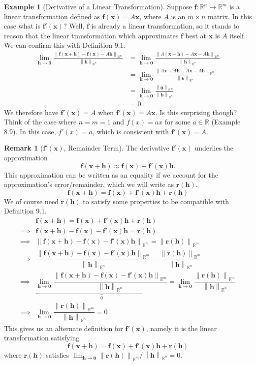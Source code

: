 \documentclass{article}
\newcommand{\R}{\mathbb{R}}
\newcommand{\x}{\mathbf{x}}
\newcommand{\f}{\mathbf{f}}
\newcommand{\h}{\mathbf{h}}
\newcommand{\ze}{\mathbf{0}}
\newcommand{\norm}[1]{\left\lVert#1\right\rVert}
\theoremstyle{definition}
\newtheorem{example}{Example}[section]
\newtheorem{remark}{Remark}[section]
\begin{document}
	\begin{example}[Derivative of a Linear Transformation]
		Suppose $ \f:\R^n\to \R^m $ is a linear transformation defined as $ \f(\x)=A\x $, where  $ A $ is an $ m\times n $ matrix. In this case what is $ \f'(\x) $? Well, $ \f $ is already a linear transformation, so it stands to reason that the linear transformation which approximates $ \f $ best at $ \x $ is $ A $ itself. We can confirm this with Definition 9.1:
		\begin{align*}
			\lim\limits_{\mathbf h\to \ze}\frac{\norm{\f(\x+\mathbf h) - \f(\x)-A\mathbf{h}}_{\R^m}}{\norm{\mathbf h}_{\R^n}} & = 	\lim\limits_{\mathbf h\to \ze}\frac{\norm{A(\x+\mathbf h) - A\x-A\mathbf{h}}_{\R^m}}{\norm{\mathbf h}_{\R^n}} \\ & = 	\lim\limits_{\mathbf h\to \ze}\frac{\norm{A\x+ A\mathbf h - A\x-A\mathbf{h}}_{\R^m}}{\norm{\mathbf h}_{\R^n}}\\
			& = \lim\limits_{\mathbf h\to \ze}\frac{\norm{\ze}_{\R^m}}{\norm{\mathbf h}_{\R^n}}\\ & = 0.
		\end{align*}
		We therefore have $ \f'(\x)= A $ when $ \f'(\x)=A\x $. Is this surprising though? Think of the case where $ n=m=1 $ and $ f(x)=ax $ for some $ a\in \R $ (Example 8.9). In this case, $ f'(x)=a $, which is consistent with $ \f'(\x) = A$. 
	\end{example}
	\begin{remark}[$ \f'(\x) $,  Remainder Term]
		The derivative $ \f'(\x) $ underlies the approximation 
		$$\f(\x+\h) \approx \f(\x) + \f'(\x)\h .$$ This approximation can be written as an equality if we account for the approximation's error/remainder, which we will write as $ \mathbf r(\h) $. $$ \f(\x+\h) = \f(\x) + \f'(\x)\h + \mathbf r(\h) $$ 
		We of course need $ \mathbf r(\h) $ to satisfy some properties to be compatible with Definition 9.1. 
		\begin{align*}
			& \f(\x+\h) = \f(\x) + \f'(\x)\h + \mathbf r(\h)\\
			\implies & \f(\x+\h) - \f(\x) - \f'(\x)\h   =  \mathbf r(\h)\\ 
			\implies & \norm{\f(\x+\h) - \f(\x) - \f'(\x)\h}_{\R^m} = \norm{\mathbf r(\h)}_{\R^m}\\
			\implies & \dfrac{\norm{\f(\x+\h) - \f(\x) - \f'(\x)\h}_{\R^m}}{\norm{\h}_{\R^n}} = \dfrac{\norm{\mathbf r(\h)}_{\R^m}}{\norm{\h}_{\R^n}}\\
			\implies & \underbrace{\lim\limits_{\mathbf h\to \ze}\dfrac{\norm{\f(\x+\h) - \f(\x) - \f'(\x)\h}_{\R^m}}{\norm{\h}_{\R^n}}}_0 = \lim\limits_{\mathbf h\to \ze}\dfrac{\norm{\mathbf r(\h)}_{\R^m}}{\norm{\h}_{\R^n}} \\
			\implies & \lim\limits_{\mathbf h\to \ze}\dfrac{\norm{\mathbf r(\h)}_{\R^m}}{\norm{\h}_{\R^n}} = 0
		\end{align*}
		This gives us an alternate definition for $ \f'(\x) $, namely it is the linear transformation satisfying 
		$$ \f(\x+\h) = \f(\x) + \f'(\x)\h + \mathbf r(\h) $$ where $ \mathbf r(\h) $ satisfies  $\lim_{\mathbf h\to \ze}{\norm{\mathbf r(\h)}_{\R^m}}/{\norm{\h}_{\R^n}} = 0$.
	\end{remark}
	
\end{document}

